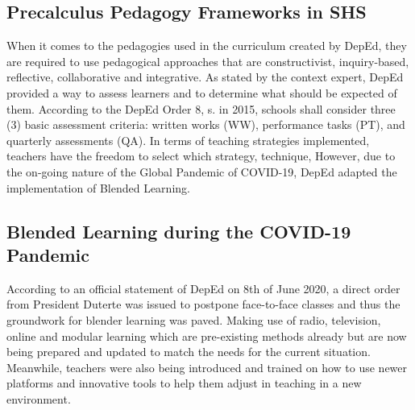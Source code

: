 \subsection{Precalculus Pedagogy Frameworks in SHS}
When it comes to the pedagogies used in the curriculum created by DepEd, they are required to use pedagogical approaches that are constructivist, inquiry-based, reflective, collaborative and integrative. As stated by the context expert, DepEd provided a way to assess learners and to determine what should be expected of them. According to the DepEd Order 8, s. in 2015, schools shall consider three (3) basic assessment criteria: written works (WW),  performance tasks (PT), and quarterly assessments (QA). In terms of teaching strategies implemented, teachers have the freedom to select which strategy, technique, However, due to the on-going nature of the Global Pandemic of COVID-19, DepEd adapted the implementation of Blended Learning.
\subsection{Blended Learning during the COVID-19 Pandemic}
According to an official statement of DepEd on 8th of June 2020, a direct order from President Duterte was issued to postpone face-to-face classes and thus the groundwork for blender learning was paved. Making use of radio, television, online and modular learning which are pre-existing methods already but are now being prepared and updated to match the needs for the current situation. Meanwhile, teachers were also being introduced and trained on how to use newer platforms and innovative tools to help them adjust in teaching in a new environment.

